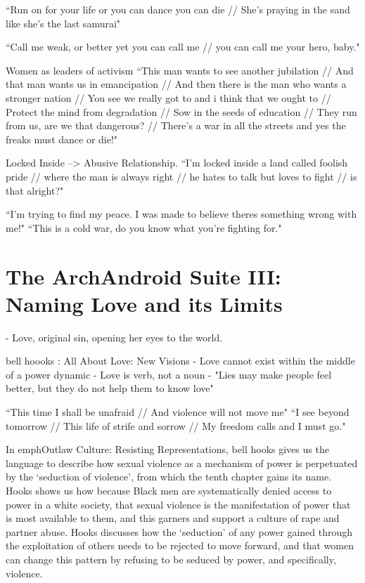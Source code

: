\documentclass[a4paper, 11pt]{article} %
\begin{document}
``Run on for your life or you can dance you can die // She's praying in the sand like she's the last samurai"\cite{danceordie}

``Call me weak, or better yet you can call me // you can call me your hero, baby."\cite{faster}

Women as leaders of activism
``This man wants to see another jubilation //
And that man wants us in emancipation //
And then there is the man who wants a stronger nation //
You see we really got to and i think that we ought to //
Protect the mind from degradation //
Sow in the seeds of education //
They run from us, are we that dangerous? //
There's a war in all the streets and yes the freaks must dance or die!"\cite{danceordie}

Locked Inside --> Abusive Relationship.
``I'm locked inside a land called foolish pride // where the man is always right // he hates to talk but loves to fight // is that alright?"\cite{lockedinside}

``I'm trying to find my peace.  I was made to believe theres something wrong with me!"\cite{coldwar}
``This is a cold war, do you know what you're fighting for."\cite{coldwar}




\section*{The ArchAndroid Suite III: Naming Love and its Limits}


- Love, original sin, opening her eyes to the world.

bell hoooks : All About Love: New Visions
- Love cannot exist within the middle of a power dynamic
- Love is verb, not a noun
- "Lies may make people feel better, but they do not help them to know love" 

``This time I shall be unafraid // And violence will not move me"\cite{babopbyeya}
``I see beyond tomorrow // This life of strife and sorrow // My freedom calls and I must go."\cite{babopbyeya}

In emph{Outlaw Culture: Resisting Representations}, bell hooks gives us the language to describe how sexual violence as a mechanism of power is perpetuated by the `seduction of violence', from which the tenth chapter gains its name.\cite{hooks1994outlaw}
Hooks shows us how because Black men are systematically denied access to power in a white society, that sexual violence is the manifestation of power that is most available to them, and this garners and support a culture of rape and partner abuse.
Hooks discusses how the `seduction' of any power gained through the exploitation of others needs to be rejected to move forward, and that women can change this pattern by refusing to be seduced by power, and specifically, violence.
\end{document}
